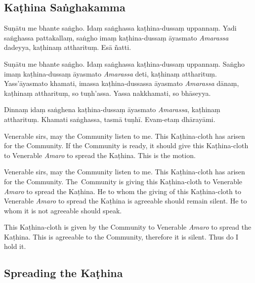 \subsection{Kaṭhina Saṅghakamma}
\label{kathina-sanghakamma}

\enlargethispage{\baselineskip}


Suṇātu me bhante saṅgho. Idaṃ saṅghassa kaṭhina-dussaṃ uppannaṃ. Yadi saṅghassa
pattakallaṃ, saṅgho imaṃ kaṭhina-dussaṃ āyasmato \emph{Amarassa} dadeyya,
kaṭhinaṃ attharituṃ. Esā ñatti.

Suṇātu me bhante saṅgho. Idaṃ saṅghassa kaṭhina-dussaṃ uppannaṃ. Saṅgho imaṃ
kaṭhina-dussaṃ āyasmato \emph{Amarassa} deti, kaṭhinaṃ attharituṃ.
Yass'āyasmato khamati, imassa kaṭhina-dussassa āyasmato \emph{Amarassa} dānaṃ,
kaṭhinaṃ attharituṃ, so tuṇh'assa. Yassa nakkhamati, so bhāseyya.

Dinnaṃ idaṃ saṅghena kaṭhina-dussaṃ āyasmato \emph{Amarassa}, kaṭhinaṃ
attharituṃ. Khamati saṅghassa, tasmā tuṇhī. Evam-etaṃ dhārayāmi.


\begin{english}
Venerable sirs, may the Community listen to me. This Kaṭhina-cloth has arisen
for the Community. If the Community is ready, it should give this Kaṭhina-cloth
to Venerable \emph{Amaro} to spread the Kaṭhina. This is the motion.

\bigskip

Venerable sirs, may the Community listen to me. This Kaṭhina-cloth has arisen
for the Community. The~Community is giving this Kaṭhina-cloth to Venerable
\emph{Amaro} to spread the Kaṭhina. He to whom the giving of this Kaṭhina-cloth
to Venerable \emph{Amaro} to spread the Kaṭhina is agreeable should remain
silent. He to whom it is not agreeable should speak.

\bigskip

This Kaṭhina-cloth is given by the Community to Venerable \emph{Amaro} to
spread the Kaṭhina. This is agreeable to the Community, therefore it is silent.
Thus do I hold it.
\end{english}

\subsection{Spreading the Kaṭhina}
\label{spreading-the-kathina}

